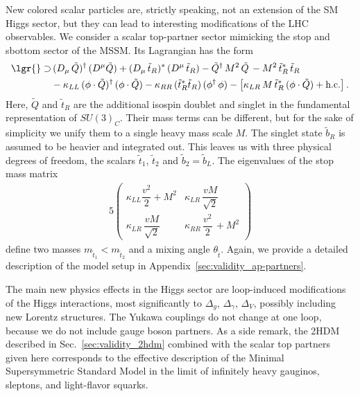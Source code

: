 New colored scalar particles are, strictly speaking, not an extension
of the SM Higgs sector, but they can lead to interesting modifications
of the LHC observables. We consider a scalar top-partner sector
mimicking the stop and sbottom sector of the MSSM. Its Lagrangian has
the form
%
\begin{alignat}{5} \lgr{} \supset& \,
(D_{\mu}\,\tilde{Q})^\dagger\,(D^\mu\tilde{Q}) +
(D_\mu\,{\tilde{t}_R})^*\,(D^\mu\,{\tilde{t}_R}) -
\tilde{Q}^\dagger\,M^2\,\tilde{Q}\, -
M^2\,{\tilde{t}_R}^*\,{\tilde{t}_R} \notag \\ &-\kappa_{LL}\,(\phi
\cdot \tilde{Q})^\dagger\,(\phi \cdot\tilde{Q})
-\kappa_{RR}\,({\tilde{t}_R}^*{\tilde{t}_R})\,(\phi^\dagger\,\phi) -
\left[ \kappa_{LR} \, M \, {\tilde{t}_R}^*\,(\phi \cdot \tilde{Q}) +
\text{h.c.} \right]
 \label{eq:partner_lag}.
 \end{alignat}
%
Here, $\tilde{Q}$ and ${\tilde{t}_R}$ are the additional isospin
doublet and singlet in the fundamental representation of
$SU(3)_C$. Their mass terms can be different, but for the sake of
simplicity we unify them to a single heavy mass scale $M$. The singlet
state ${\tilde{b}_{R}}$ is assumed to be heavier and integrated
out. This leaves us with three physical degrees of freedom, the
scalars $\tilde{t}_1$, $\tilde{t}_2$ and $\tilde{b}_2=
\tilde{b}_L$. The eigenvalues of the stop mass matrix
%
\begin{alignat}{5}
 \begin{pmatrix} \kappa_{LL}\dfrac{v^2}{2} + M^2 &
\kappa_{LR}\,\dfrac{vM}{\sqrt{2}} \\ \kappa_{LR}\,\dfrac{vM}{\sqrt{2}}
& \kappa_{RR}\,\dfrac{v^2}{2}\, + M^2
 \end{pmatrix}
  \label{eq:partner_mass}
\end{alignat}
%
define two masses $m_{\tilde{t}_{1}} < m_{\tilde{t}_{2}}$ and a mixing
angle $\theta_{\tilde{t}}$. Again, we provide a detailed description
of the model setup in Appendix~\ref{sec:validity_ap-partners}.\medskip

The main new physics effects in the Higgs sector are loop-induced
modifications of the Higgs interactions, most significantly to
$\Delta_g$, $\Delta_\gamma$, $\Delta_V$, possibly including new
Lorentz structures.  The Yukawa couplings do not change at one loop,
because we do not include gauge boson partners. As a side remark, the
2HDM described in Sec.~\ref{sec:validity_2hdm} combined with the scalar top
partners given here corresponds to the effective description of the
Minimal Supersymmetric Standard Model in the limit of infinitely heavy
gauginos, sleptons, and light-flavor squarks.  \medskip

